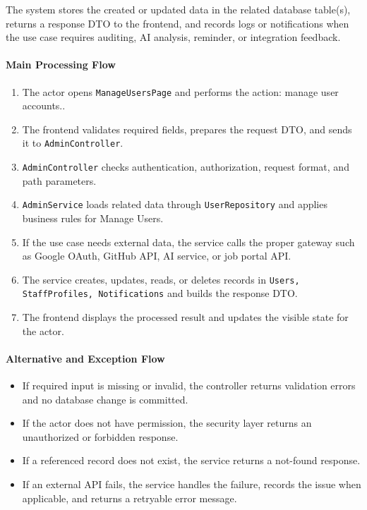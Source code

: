 The system stores the created or updated data in the related database table(s), returns a response DTO to the frontend, and records logs or notifications when the use case requires auditing, AI analysis, reminder, or integration feedback.

\paragraph{Main Processing Flow}

\begin{enumerate}
    \item The actor opens \texttt{ManageUsersPage} and performs the action: manage user accounts..
    \item The frontend validates required fields, prepares the request DTO, and sends it to \texttt{AdminController}.
    \item \texttt{AdminController} checks authentication, authorization, request format, and path parameters.
    \item \texttt{AdminService} loads related data through \texttt{UserRepository} and applies business rules for Manage Users.
    \item If the use case needs external data, the service calls the proper gateway such as Google OAuth, GitHub API, AI service, or job portal API.
    \item The service creates, updates, reads, or deletes records in \texttt{Users, StaffProfiles, Notifications} and builds the response DTO.
    \item The frontend displays the processed result and updates the visible state for the actor.
\end{enumerate}

\paragraph{Alternative and Exception Flow}

\begin{itemize}
    \item If required input is missing or invalid, the controller returns validation errors and no database change is committed.
    \item If the actor does not have permission, the security layer returns an unauthorized or forbidden response.
    \item If a referenced record does not exist, the service returns a not-found response.
    \item If an external API fails, the service handles the failure, records the issue when applicable, and returns a retryable error message.
\end{itemize}

